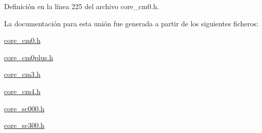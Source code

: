 Definición en la línea 225 del archivo core\+\_\+cm0.\+h.



La documentación para esta unión fue generada a partir de los siguientes ficheros\+:\begin{DoxyCompactItemize}
\item 
\hyperlink{core__cm0_8h}{core\+\_\+cm0.\+h}\item 
\hyperlink{core__cm0plus_8h}{core\+\_\+cm0plus.\+h}\item 
\hyperlink{core__cm3_8h}{core\+\_\+cm3.\+h}\item 
\hyperlink{core__cm4_8h}{core\+\_\+cm4.\+h}\item 
\hyperlink{core__sc000_8h}{core\+\_\+sc000.\+h}\item 
\hyperlink{core__sc300_8h}{core\+\_\+sc300.\+h}\end{DoxyCompactItemize}
